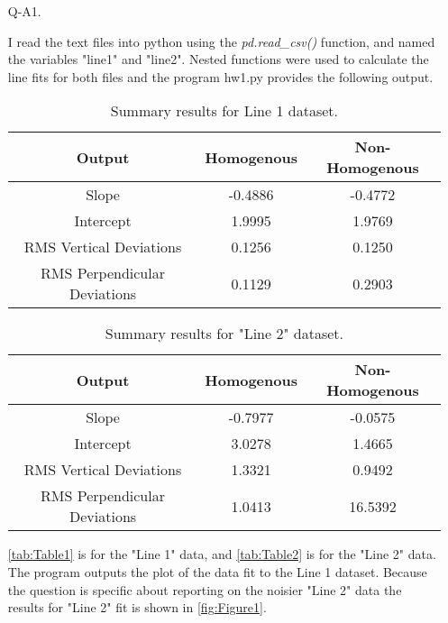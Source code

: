 \documentclass[12pt]{report}
\begin{document}
\begin{enumerate}

    \item[Q-A1.]

    I read the text files into python using the \emph{pd.read\_csv()} function, and named the variables "line1" and "line2". Nested 
    functions were used to calculate the line fits for both files and the program hw1.py provides the following output.


    \begin{table}[h!]
    \begin{center}
    \begin{tabular}{ c | c | c } 
        \hline
        Output & Homogenous & Non-Homogenous \\ 
        \hline \hline
        Slope & -0.4886 & -0.4772 \\ 
        Intercept & 1.9995 & 1.9769 \\ 
        RMS Vertical Deviations & 0.1256 & 0.1250 \\ 
        RMS Perpendicular Deviations & 0.1129 & 0.2903  \\ 
        \hline
    \end{tabular}
    \caption{Summary results for Line 1 dataset.}
    \label{tab:Table1}
    \end{center}
    \end{table}
    
    \begin{table}[h!]
    \begin{center}
    \begin{tabular}{ c | c | c } 
        \hline
        Output & Homogenous & Non-Homogenous \\ 
        \hline \hline
        Slope & -0.7977 & -0.0575 \\ 
        Intercept & 3.0278 & 1.4665 \\ 
        RMS Vertical Deviations & 1.3321 & 0.9492 \\ 
        RMS Perpendicular Deviations & 1.0413 & 16.5392  \\ 
        \hline
    \end{tabular}
    \caption{Summary results for "Line 2" dataset.}
    \label{tab:Table2}
    \end{center}
    \end{table}

    \FloatBarrier 

    \autoref{tab:Table1} is for the "Line 1" data, and \autoref{tab:Table2} is for the "Line 2" data. The program outputs the plot 
    of the data fit to the Line 1 dataset. Because the question is specific about reporting on the noisier "Line 2" data the results 
    for "Line 2" fit is shown in \autoref{fig:Figure1}.


\end{enumerate}
\end{document}
